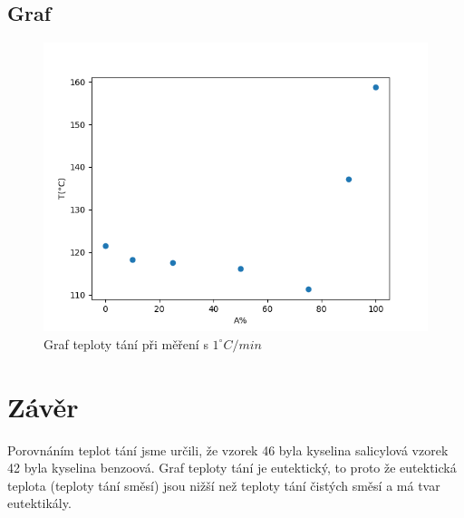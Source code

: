 \documentclass[13pt, a4paper, twoside]{article}
\begin{document}
\begin{enumerate}
\subsection*{Graf}
\begin{figure}[H]
    \centering
    \includegraphics[width=5in]{teplota_tani_graf.png}
    \caption*{Graf teploty tání při měření s $1^{\circ}C/min$}
\end{figure}

\section*{Závěr}
Porovnáním teplot tání jsme určili, že vzorek 46 byla kyselina salicylová vzorek 42 byla kyselina benzoová. Graf teploty tání je eutektický, to proto že eutektická teplota (teploty tání směsí) jsou nižší než teploty tání čistých směsí a má tvar eutektikály.




\end{enumerate}
\end{document}

